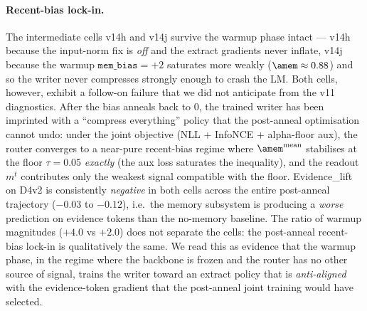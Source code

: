 \paragraph{Recent-bias lock-in.}
The intermediate cells v14h and v14j survive the warmup phase
intact --- v14h because the input-norm fix is \emph{off} and the
extract gradients never inflate, v14j because the warmup
$\texttt{mem\_bias}{=}{+2}$ saturates more weakly
($\amem \approx 0.88$) and so the writer never compresses
strongly enough to crash the LM. Both cells, however, exhibit a
follow-on failure that we did not anticipate from the v11
diagnostics. After the bias anneals back to $0$, the trained writer
has been imprinted with a ``compress everything'' policy that the
post-anneal optimisation cannot undo: under the joint objective
(NLL + InfoNCE + alpha-floor aux), the router converges to a
near-pure recent-bias regime where $\amem^{\text{mean}}$ stabilises
at the floor $\tau{=}0.05$ \emph{exactly} (the aux loss saturates
the inequality), and the readout $m^t$ contributes only the
weakest signal compatible with the floor. Evidence\_lift on D4v2
is consistently \emph{negative} in both cells across the entire
post-anneal trajectory ($-0.03$ to $-0.12$), i.e.\ the memory
subsystem is producing a \emph{worse} prediction on evidence
tokens than the no-memory baseline. The ratio of warmup magnitudes
($+4.0$ vs $+2.0$) does not separate the cells: the post-anneal
recent-bias lock-in is qualitatively the same. We read this as
evidence that the warmup phase, in the regime where the backbone
is frozen and the router has no other source of signal, trains the
writer toward an extract policy that is \emph{anti-aligned} with the
evidence-token gradient that the post-anneal joint training would
have selected.

